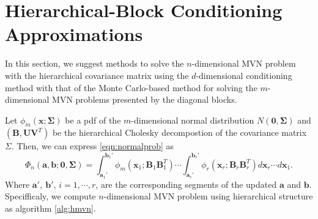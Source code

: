 
\section{Hierarchical-Block Conditioning Approximations}


In this section, we suggest methods to solve the $n$-dimensional MVN problem with the hierarchical covariance matrix using the $d$-dimensional conditioning method with that of the Monte Carlo-based method for solving the $m$-dimensional MVN problems presented by the diagonal blocks.

Let $\phi_m(\mathbf{x}; \boldsymbol{\Sigma})$ be a pdf of the $m$-dimensional normal distribution $N(\mathbf{0}, \boldsymbol{\Sigma})$ and $(\mathbf{B}, \mathbf{U}\mathbf{V}^T)$ be the hierarchical Cholesky decompostion of the covariance matrix $\Sigma$. Then, we can express \eqref{eqn:normalprob} as 
\begin{equation}\label{eqn:hmvn}
    \Phi_n(\mathbf{a}, \mathbf{b}; \mathbf{0}, \boldsymbol{\Sigma}) 
    = \int_{\mathbf{a}_1'}^{\mathbf{b}_1'} \phi_m(\mathbf{x}_1; \mathbf{B}_1\mathbf{B}_1^T) 
    \cdots 
    \int_{\mathbf{a}_r'}^{\mathbf{b}_r'} \phi_r(\mathbf{x}_r; \mathbf{B}_r\mathbf{B}_r^T) d\mathbf{x}_r \cdots d\mathbf{x}_1.
\end{equation}
Where $\mathbf{a}',~\mathbf{b}'$, $i=1,\cdots,r$, are the corresponding segments of the updated $\mathbf{a}$ and $\mathbf{b}$. Specifficaly, we compute $n$-dimensional MVN problem using hierarchical structure as algorithm \ref{alg:hmvn}.

